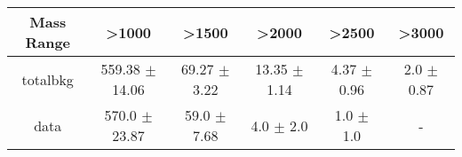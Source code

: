 \begin{footnotesize} 
\begin{tabular}{c|c|c|c|c|c} 
Mass Range & >1000 & >1500 & >2000 & >2500 & >3000 \\ 
\hline\hline 
totalbkg & 559.38 $\pm$ 14.06 & 69.27 $\pm$ 3.22 & 13.35 $\pm$ 1.14 & 4.37 $\pm$ 0.96 & 2.0 $\pm$ 0.87\\ 
data & 570.0 $\pm$ 23.87 & 59.0 $\pm$ 7.68 & 4.0 $\pm$ 2.0 & 1.0 $\pm$ 1.0 &  - \\ 
\hline\hline 
\end{tabular} 
\end{footnotesize} 
\newline 
